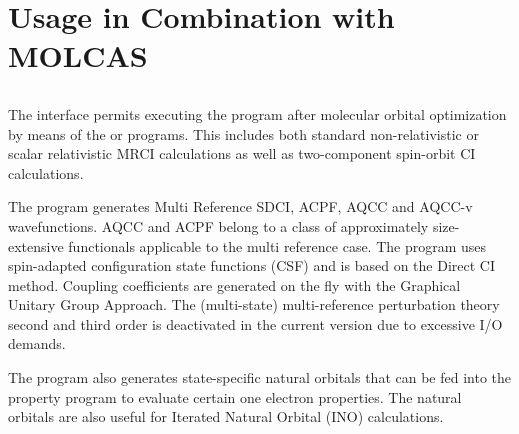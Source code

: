 \chapter{Usage in Combination with MOLCAS}
\section{}
\label{UG:sec:COLUMBUS}

The  interface permits executing the
 program after molecular orbital optimization
by means of the  or  programs.
This includes both standard non-relativistic or scalar relativistic
MRCI calculations as well as two-component spin-orbit CI calculations\cite{Lischka:01}.

The  program generates 
Multi Reference SDCI\cite{Lischka:01},  ACPF\cite{Gdanitz:88}, AQCC\cite{Szalay:93}
and AQCC-v\cite{Szalay:97}
wavefunctions. AQCC and ACPF belong to a class of approximately 
size-extensive functionals applicable to the multi reference case.
The program uses spin-adapted configuration state functions (CSF)
and is based on the Direct CI method\cite{Roos:72}.
Coupling coefficients are generated on the fly 
with the Graphical Unitary Group Approach\cite{Shavitt:77}.
The (multi-state) multi-reference perturbation theory second and third order
\cite{shavitt:02} is deactivated in the current version due 
to excessive I/O demands. 

The  program also generates state-specific
natural orbitals that can be fed into
the property program to evaluate certain one electron properties.
The natural orbitals are also useful for Iterated Natural Orbital
(INO)  calculations.

